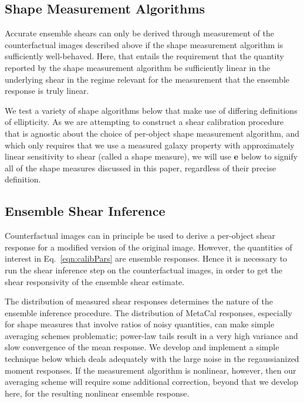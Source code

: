 \documentclass[iop]{emulateapj}
\newcommand\rmcomment[1]{\textcolor{red}{(RM: #1)}}
\begin{document}
\subsection{Shape Measurement Algorithms}
\label{subsec:shapemeas}
Accurate ensemble shears can only be derived through measurement of
the counterfactual images described above if the shape measurement
algorithm is sufficiently well-behaved. Here, that entails the
requirement that the quantity reported by the shape measurement
algorithm be sufficiently linear in the underlying shear in the regime
relevant for the measurement that the ensemble response is truly
linear.


We test a variety of shape algorithms below that make use of differing
definitions of ellipticity. As we are attempting to construct a shear
calibration procedure that is agnostic about the choice of per-object
shape measurement algorithm, and which only requires that we use a
measured galaxy property with approximately linear sensitivity to
shear (called a shape measure), we will use $\mathbf{e}$ below to
signify all of the shape measures discussed in this paper, regardless
of their precise definition.

\subsection{Ensemble Shear Inference}
Counterfactual images can in principle be used to derive a per-object
shear response for a modified version of the original image.  However,
the quantities of interest in Eq.~\ref{eqn:calibPars} are ensemble
responses.  Hence it is necessary to run the shear inference
step on the counterfactual images, in order to get the shear
responsivity of the ensemble shear estimate.

The distribution of measured shear responses determines the nature of
the ensemble inference procedure. The distribution of MetaCal
responses, especially for shape measures that involve ratios of noisy
quantities, can make simple averaging schemes problematic; power-law
tails result in a very high variance and slow convergence of the mean
response. We develop and implement a simple technique below which
deals adequately with the large noise in the regaussianized moment
responses. If the measurement algorithm is nonlinear, however, then
our averaging scheme will require some additional correction, beyond
that we develop here, for the resulting nonlinear ensemble response.
\end{document}
